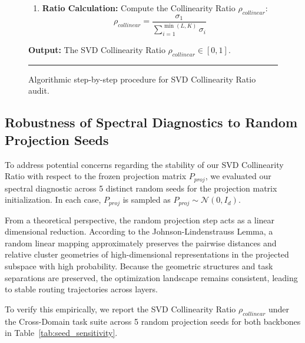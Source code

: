 \begin{figure}[H]
\begin{center}
\begin{minipage}{0.9\textwidth}
\begin{enumerate}
    $$\Sigma = \text{SVD}(A) \implies \Sigma = \{\sigma_1, \sigma_2, \dots, \sigma_{\min(L, K)}\} \quad \text{where } \sigma_1 \ge \sigma_2 \ge \dots$$
    \item \textbf{Ratio Calculation:} Compute the Collinearity Ratio $\rho_{collinear}$:
    $$\rho_{collinear} = \frac{\sigma_1}{\sum_{i=1}^{\min(L, K)} \sigma_i}$$
\end{enumerate}
\textbf{Output:} The SVD Collinearity Ratio $\rho_{collinear} \in [0, 1]$.
\vspace{4pt}
\hrule
\end{minipage}
\end{center}
\caption{Algorithmic step-by-step procedure for SVD Collinearity Ratio audit.}
\label{alg:svd_collinearity}
\end{figure}

\subsection{Robustness of Spectral Diagnostics to Random Projection Seeds}
\label{app:projection_seed_robustness}

To address potential concerns regarding the stability of our SVD Collinearity Ratio with respect to the frozen projection matrix $P_{proj}$, we evaluated our spectral diagnostic across 5 distinct random seeds for the projection matrix initialization. In each case, $P_{proj}$ is sampled as $P_{proj} \sim \mathcal{N}(0, I_d)$.

From a theoretical perspective, the random projection step acts as a linear dimensional reduction. According to the Johnson-Lindenstrauss Lemma, a random linear mapping approximately preserves the pairwise distances and relative cluster geometries of high-dimensional representations in the projected subspace with high probability. Because the geometric structures and task separations are preserved, the optimization landscape remains consistent, leading to stable routing trajectories across layers.

To verify this empirically, we report the SVD Collinearity Ratio $\rho_{collinear}$ under the Cross-Domain task suite across 5 random projection seeds for both backbones in Table~\ref{tab:seed_sensitivity}.

